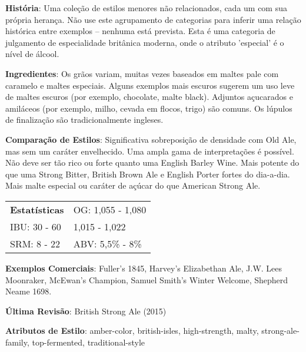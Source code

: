 \textbf{História}: Uma coleção de estilos menores não relacionados, cada um com sua própria herança. Não use este agrupamento de categorias para inferir uma relação histórica entre exemplos – nenhuma está prevista. Esta é uma categoria de julgamento de especialidade britânica moderna, onde o atributo 'especial' é o nível de álcool.

\textbf{Ingredientes}: Os grãos variam, muitas vezes baseados em maltes pale com caramelo e maltes especiais. Alguns exemplos mais escuros sugerem um uso leve de maltes escuros (por exemplo, chocolate, malte black). Adjuntos açucarados e amiláceos (por exemplo, milho, cevada em flocos, trigo) são comuns. Os lúpulos de finalização são tradicionalmente ingleses.

\textbf{Comparação de Estilos}: Significativa sobreposição de densidade com Old Ale, mas sem um caráter envelhecido. Uma ampla gama de interpretações é possível. Não deve ser tão rico ou forte quanto uma English Barley Wine. Mais potente do que uma Strong Bitter, British Brown Ale e English Porter fortes do dia-a-dia. Mais malte especial ou caráter de açúcar do que American Strong Ale.

\begin{tabular}{@{}p{35mm}p{35mm}@{}}
  \textbf{Estatísticas} & OG: 1,055 - 1,080 \\
  IBU: 30 - 60  & 1,015 - 1,022  \\
  SRM: 8 - 22  & ABV: 5,5\% - 8\%
\end{tabular}

\textbf{Exemplos Comerciais}: Fuller’s 1845, Harvey’s Elizabethan Ale, J.W. Lees Moonraker, McEwan’s Champion, Samuel Smith’s Winter Welcome, Shepherd Neame 1698.

\textbf{Última Revisão}: British Strong Ale (2015)

\textbf{Atributos de Estilo}: amber-color, british-isles, high-strength, malty, strong-ale-family, top-fermented, traditional-style
